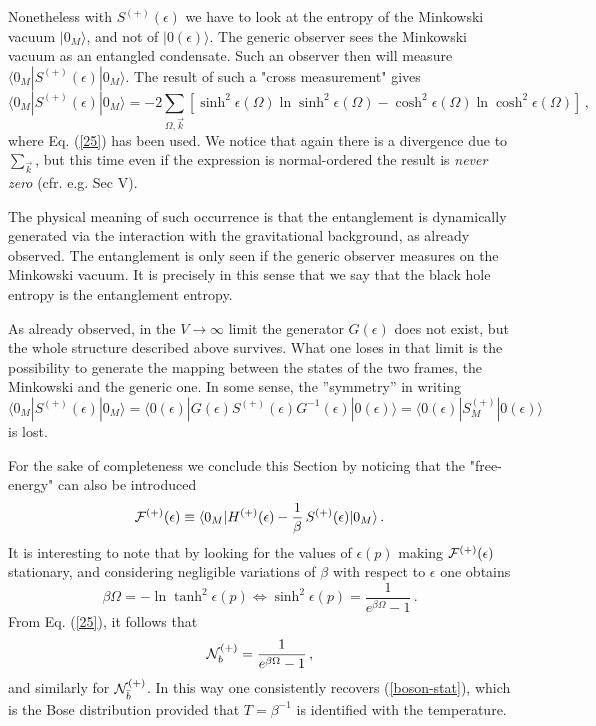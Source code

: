 \noindent Nonetheless with $S^{(+)}(\epsilon)$ we have to look at
the entropy of the Minkowski vacuum $|0_M\rangle$, and not of
$|0(\epsilon)\rangle$. The generic observer sees the Minkowski
vacuum as an entangled condensate. Such an observer then will
measure $\langle 0_M| S^{(+)}(\epsilon)|0_M\rangle$. The result of
such a "cross measurement" gives
\begin{equation}
\label{entropy-cross} \langle 0_M|S^{(+)}(\epsilon)|0_M\rangle = -
2 \sum_{\Omega, \vec k} \left[\sinh^2 \epsilon(\Omega) \ln \sinh^2
\epsilon(\Omega) - \cosh^2 \epsilon(\Omega) \ln \cosh^2
\epsilon(\Omega)\right] \,,
\end{equation}
where Eq. (\ref{25}) has been used. We notice that again there is
a divergence due to $\sum_{\vec k}$, but this time even if the
expression is normal-ordered the result is {\it never zero} (cfr.
e.g. Sec V).

\noindent The physical meaning of such occurrence is that the
entanglement is dynamically generated via the interaction with the
gravitational background, as already observed. The entanglement is
only seen if the generic observer measures on the Minkowski
vacuum. It is precisely in this sense that we say that the black
hole entropy is the entanglement entropy.

\noindent As already observed, in the $V \to \infty$ limit the
generator $G(\epsilon)$ does not exist, but the whole structure
described above survives. What one loses in that limit is the
possibility to generate the mapping between the states of the two
frames, the Minkowski and the generic one. In some sense, the
''symmetry'' in writing $\langle 0_M| S^{(+)}(\epsilon)|0_M\rangle
= \langle 0(\epsilon)|G(\epsilon) S^{(+)}(\epsilon)
G^{-1}(\epsilon) |0(\epsilon)\rangle =\langle 0(\epsilon)|
S^{(+)}_M|0(\epsilon)\rangle $ is lost.

\noindent For the sake of completeness we conclude this Section by
noticing that the "free-energy" can also be introduced
\cite{umezawa}
 \begin{equation}\label{22}
  {\cal F}^{(+)}(\epsilon)\equiv \langle 0_M|H^{(+)} (\epsilon)
  -\frac{1}{\beta} \, S^{(+)}(\epsilon)|0_M\rangle \,{.}
 \end{equation}
It is interesting to note that by looking for the values of
$\epsilon (p)$ making ${\cal F}^{(+)}(\epsilon)$ stationary, and
considering negligible variations of $\beta$ with respect to
$\epsilon$ one obtains
 \begin{equation}\label{24}
 \beta\Omega = - \ln\tanh^2\epsilon (p) \Leftrightarrow
 \sinh^2\epsilon (p)= \frac{1}{e^{\beta\Omega}-1}\,{.}
 \end{equation}
From Eq. (\ref{25}), it follows that
 \begin{equation}\label{Ndist}
 {\cal N}^{(+)}_{b} = \frac{1}{e^{\beta\Omega}-1}\,,
 \end{equation}
and similarly for ${\cal N}^{(+)}_{\bar{b}}$. In this way one
consistently recovers (\ref{boson-stat}), which is the Bose
distribution provided that $T=\beta^{-1}$ is identified with the
temperature.

